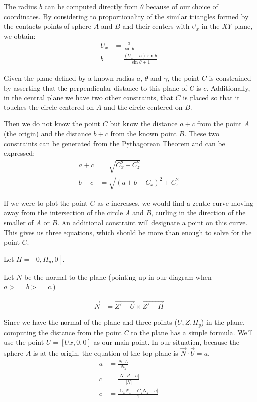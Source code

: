 \documentclass{article}
\begin{document}
The radius $b$ can be computed directly from $\theta$
because of our choice of coordinates.
By considering to proportionality of the similar triangles formed
by the contacts points of sphere $A$ and $B$ and their centers with $U_x$ in the $XY$ plane,
we obtain:
\begin{align}
  U_x &= \frac{a}{\sin{\theta}} \\
  b &= \frac{(U_x - a)\sin{\theta}}{\sin{\theta}+1}
\end{align}

\newcommand{\abs}[1]{ \left\lvert#1\right\rvert}

Given the plane defined by a known radius $a$, $\theta$ and $\gamma$,
the point $C$ is constrained by asserting that the perpendicular
distance to this plane of $C$ is $c$.
Additionally, in the central plane we have two other constraints,
that $C$ is placed so that it touches the circle centered on $A$ and
the circle centered on $B$.

Then we do not know the point $C$ but know the distance $a+c$ from
the point $A$ (the origin) and the distance $b+c$ from the known
point $B$. These two constraints can be generated from the Pythagorean Theorem and can be expressed:
\begin{align}
a + c &= \sqrt{C_x^2 + C_z ^2} \label{eq:a_constraint}\\
b + c &= \sqrt{(a+b-C_x)^2 + C_z^2} \label{eq:b_constraint}
\end{align}

If we were to plot the point $C$ as $c$ increases, we
would find a gentle curve moving away from the intersection
of the circle $A$ and $B$, curling in the direction of the smaller of $A$ or $B$.
An additional constraint will
designate a point on this curve.
This gives us three equations, which
should be more than enough to solve for the point $C$.

Let $H = [0, H_y,0]$.

Let $N$ be the normal to the plane (pointing up in our diagram
when $ a >= b >= c $.)

\begin{align}
\overrightarrow{N} &= \overrightarrow{Z' - U}  \times \overrightarrow{Z' - H}
\end{align}

Since we have the normal of the plane and three points ($U,Z,H_y$) in the plane,
computing the distance from the point $C$ to the plane has a simple
formula.
We'll use the point $U = [Ux, 0, 0]$ as our main point.
In our situation, because the sphere $A$ is at the origin,
the equation of the top plane  is
$ \overrightarrow{N} \cdot \overrightarrow{U} = a$.
\begin{align}
a &= \frac{N \cdot U}{N_y} \\
c &= \frac{\abs{N \cdot P - a}}{\abs{N}} \\
c &= \frac{\abs{C_x  N_x  + C_z  N_z - a}}{1} \label{eq:c_constraint}
\end{align}
\end{document}
